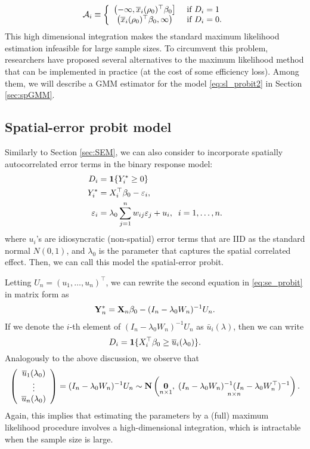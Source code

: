 \documentclass[11pt, A4paper, openany, uplatex]{book}
\begin{document}
\begin{align*}
	\mathcal{A}_i \equiv \left\{
	\begin{array}{cl}
	\left(-\infty, \overline x_i(\rho_0)^\top \beta_0 \right] & \text{ if } D_i = 1 \\
	\left(\overline x_i(\rho_0)^\top \beta_0, \infty \right)  & \text{ if } D_i = 0.
	\end{array}\right.
\end{align*}
This high dimensional integration makes the standard maximum likelihood estimation infeasible for large sample sizes.
To circumvent this problem, researchers have proposed several alternatives to the maximum likelihood method that can be implemented in practice (at the cost of some efficiency loss).
Among them, we will describe a GMM estimator for the model \eqref{eq:sl_probit2} in Section \ref{sec:spGMM}.

\subsection{Spatial-error probit model}

Similarly to Section \ref{sec:SEM}, we can also consider to incorporate spatially autocorrelated error terms in the binary response model:
\begin{align}\label{eq:se_probit}
\begin{split}
	D_i & = \mathbf{1}\{Y^*_i \geq 0\}\\
	Y^*_i & = X_i^\top \beta_0 - \varepsilon_i, \\
	\varepsilon_i & = \lambda_0  \sum_{j = 1}^n w_{ij} \varepsilon_j + u_i, \;\; i = 1, \ldots , n.
\end{split}
\end{align}
where $u_i$'s are idiosyncratic (non-spatial) error terms that are IID as the standard normal $N(0,1)$, and $\lambda_0$ is the parameter that captures the spatial correlated effect.
Then, we can call this model the spatial-error probit.

Letting $U_n = (u_1, \ldots, u_n)^\top$, we can rewrite the second equation in \eqref{eq:se_probit} in matrix form as
\begin{align*}
	\mathbf{Y}^*_n = \mathbf{X}_n \beta_0 - (I_n - \lambda_0 W_n)^{-1}U_n.
\end{align*}
If we denote the $i$-th element of $(I_n - \lambda_0 W_n)^{-1}U_n$ as $\bar u_i(\lambda)$, then we can write
\[
	D_i = \mathbf{1}\{ X_i^\top \beta_0 \geq  \overline u_i(\lambda_0)\}.
\]
Analogously to the above discussion, we observe that
\[
\left( \begin{array}{c}
\overline u_1(\lambda_0) \\
\vdots \\
\overline u_n(\lambda_0)
\end{array} \right) = (I_n - \lambda_0 W_n)^{-1}U_n \sim \mathbf{N}\left(\underset{n \times 1}{\mathbf{0}}, \; \underset{n \times n}{(I_n - \lambda_0 W_n)^{-1}(I_n - \lambda_0 W_n^\top )^{-1}}\right).
\]
Again, this implies that estimating the parameters by a (full) maximum likelihood procedure involves a high-dimensional integration, which is intractable when the sample size is large.
\end{document}
